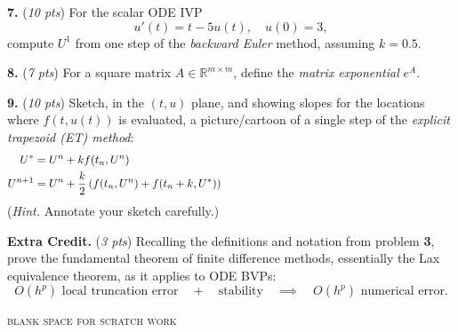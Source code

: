 \documentclass[11pt]{amsart}
\newcommand{\RR}{{\mathbb{R}}}
\newcommand{\prob}[1]{\bigskip\noindent\textbf{#1.} }
\newcommand{\pts}[1]{(\emph{#1 pts})}
\newcommand{\probpts}[2]{\prob{#1} \pts{#2}}
\begin{document}
\probpts{7}{10}   For the scalar ODE IVP
    $$u'(t) = t - 5 u(t), \quad u(0) = 3,$$
compute $U^1$ from one step of the \emph{backward Euler} method, assuming $k=0.5$.
\vspace{3.0in}


\newpage
\probpts{8}{7}  For a square matrix $A\in\RR^{m\times m}$, define the \emph{matrix exponential} $e^A$.
\vfill

\probpts{9}{10}  Sketch, in the $(t,u)$ plane, and showing slopes for the locations where $f(t,u(t))$ is evaluated, a picture/cartoon of a single step of the \emph{explicit trapezoid (ET) method}:
\begin{align*}
U^* &= U^n + k f(t_n,U^n) \hspace{4.0in} \\
U^{n+1} &= U^n + \frac{k}{2} \left(f(t_n,U^n) + f(t_n+k,U^*)\right)
\end{align*}
(\emph{Hint.}  Annotate your sketch carefully.)
\vfill


\newpage
\probpts{Extra Credit}{3}  Recalling the definitions and notation from problem \textbf{3}, prove the fundamental theorem of finite difference methods, essentially the Lax equivalence theorem, as it applies to ODE BVPs:
    $$O(h^p) \text{ local truncation error} \quad + \quad \text{stability} \quad \implies \quad O(h^p) \text{ numerical error}.$$
\vfill

\hrulefill
\begin{center}
{\footnotesize
\textsc{blank space for scratch work}
}
\end{center}
\vfill
\end{document}
